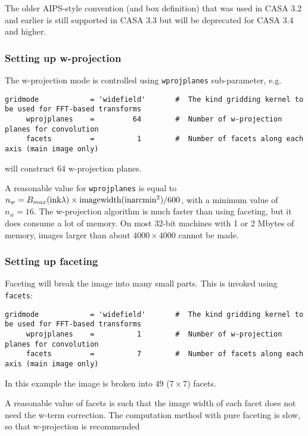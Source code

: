 The older AIPS-style convention (and box definition) that was used in
CASA 3.2 and earlier is still supported in CASA 3.3 but will be
deprecated for CASA 3.4 and higher.

\subsubsection{Setting up w-projection}
\label{section:im.clean.widefield.wproj}

The w-projection mode is controlled using {\tt wprojplanes}
sub-parameter, e.g. 
\small
\begin{verbatim}
gridmode            = 'widefield'       #  The kind gridding kernel to be used for FFT-based transforms
     wprojplanes    =         64        #  Number of w-projection planes for convolution
     facets         =          1        #  Number of facets along each axis (main image only)
\end{verbatim}
\normalsize
will construct 64 w-projection planes.

A reasonable value for {\tt wprojplanes} is equal to $n_w = B_{max}({\rm in k}\lambda)
\times {\rm imagewidth}({\rm in arcmin}^2) / 600$, with a minimum value of $n_w=16$.  The
w-projection algorithm is much faster than using faceting, but it does
consume a lot of memory.  On most 32-bit machines with 1 or 2 Mbytes
of memory, images larger than about $4000\times 4000$ cannot be made.

\subsubsection{Setting up faceting}
\label{section:im.clean.widefieldfacet}

Faceting will break the image into many small parts.  This
is invoked using {\tt facets}:
\small
\begin{verbatim}
gridmode            = 'widefield'       #  The kind gridding kernel to be used for FFT-based transforms
     wprojplanes    =          1        #  Number of w-projection planes for convolution
     facets         =          7        #  Number of facets along each axis (main image only)
\end{verbatim}
\normalsize
In this example the image is broken into 49 ($7\times7$) facets.

A reasonable value of facets is such that the image width of each facet
does not need the w-term correction.  The computation method with pure
faceting is slow, so that w-projection is recommended

